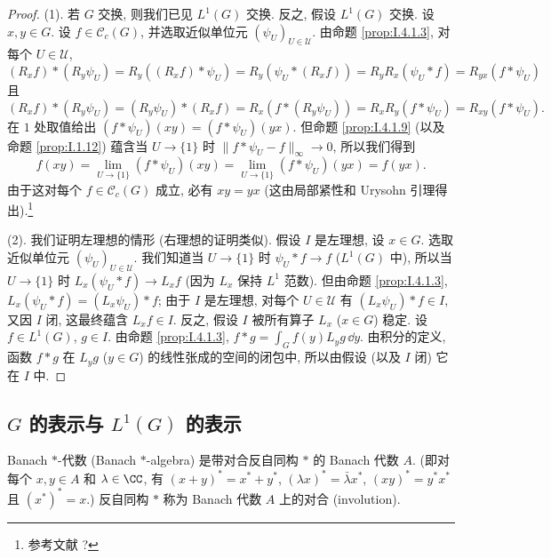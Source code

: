\begin{proof}
(1). 若 $G$ 交换, 则我们已见 $L^1(G)$ 交换. 反之, 假设 $L^1(G)$ 交换. 设 $x, y \in G$. 设 $f \in \mathcal{C}_c(G)$, 并选取近似单位元 $(\psi_U)_{U \in \mathcal{U}}$. 由命题 \ref{prop:I.4.1.3}, 对每个 $U \in \mathcal{U}$,
\[
(R_xf) * (R_y\psi_U) = R_y((R_xf) * \psi_U) = R_y(\psi_U * (R_xf)) = R_yR_x(\psi_U * f) = R_{yx}(f * \psi_U)
\]
且
\[
(R_xf) * (R_y\psi_U) = (R_y\psi_U) * (R_xf) = R_x(f * (R_y\psi_U)) = R_xR_y(f * \psi_U) = R_{xy}(f * \psi_U).
\]
在 $1$ 处取值给出 $(f * \psi_U)(xy) = (f * \psi_U)(yx)$. 但命题 \ref{prop:I.4.1.9} (以及命题 \ref{prop:I.1.12}) 蕴含当 $U \to \{1\}$ 时 $\|f * \psi_U - f\|_{\infty} \to 0$, 所以我们得到
\[
f(xy) = \lim_{U \to \{1\}}(f * \psi_U)(xy) = \lim_{U \to \{1\}}(f * \psi_U)(yx) = f(yx).
\]
由于这对每个 $f \in \mathcal{C}_c(G)$ 成立, 必有 $xy = yx$ (这由局部紧性和 Urysohn 引理得出).\footnote{参考文献 ?}

(2). 我们证明左理想的情形 (右理想的证明类似). 假设 $I$ 是左理想, 设 $x \in G$. 选取近似单位元 $(\psi_U)_{U \in \mathcal{U}}$. 我们知道当 $U \to \{1\}$ 时 $\psi_U * f \to f$ ($L^1(G)$ 中), 所以当 $U \to \{1\}$ 时 $L_x(\psi_U * f) \to L_xf$ (因为 $L_x$ 保持 $L^1$ 范数). 但由命题 \ref{prop:I.4.1.3}, $L_x(\psi_U * f) = (L_x\psi_U) * f$; 由于 $I$ 是左理想, 对每个 $U \in \mathcal{U}$ 有 $(L_x\psi_U) * f \in I$, 又因 $I$ 闭, 这最终蕴含 $L_xf \in I$.
反之, 假设 $I$ 被所有算子 $L_x$ ($x \in G$) 稳定. 设 $f \in L^1(G)$, $g \in I$. 由命题 \ref{prop:I.4.1.3}, $f * g = \int_G f(y)L_yg\,\dd y$. 由积分的定义, 函数 $f * g$ 在 $L_yg$ ($y \in G$) 的线性张成的空间的闭包中, 所以由假设 (以及 $I$ 闭) 它在 $I$ 中.
\end{proof}

\subsection{\texorpdfstring{$G$ 的表示与 $L^1(G)$ 的表示}{G 的表示与 L^1(G) 的表示}}

\begin{definition}
\label{def:I.4.2.1}
Banach $*$-代数 (Banach $\ast$-algebra) 是带对合反自同构 $*$ 的 Banach 代数 $A$. (即对每个 $x, y \in A$ 和 $\lambda \in \CC$, 有 $(x + y)^* = x^* + y^*$, $(\lambda x)^* = \bar{\lambda}x^*$, $(xy)^* = y^*x^*$ 且 $(x^*)^* = x$.)
反自同构 $*$ 称为 Banach 代数 $A$ 上的对合 (involution).
\end{definition}

